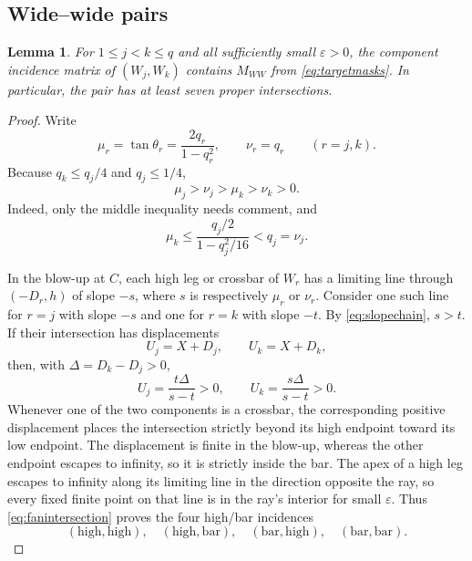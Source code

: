 \documentclass[11pt]{amsart}
\newtheorem{lemma}[lemma]{Lemma}
\theoremstyle{definition}
\newcommand{\eps}{\varepsilon}
\begin{document}
\subsection{Wide--wide pairs}

\begin{lemma}\label{lem:WW}
For $1\le j<k\le q$ and all sufficiently small $\eps>0$, the component
incidence matrix of $(W_j,W_k)$ contains $M_{WW}$ from
\eqref{eq:targetmasks}.  In particular, the pair has at least seven proper
intersections.
\end{lemma}

\begin{proof}
Write
\[
 \mu_r=\tan\theta_r=\frac{2q_r}{1-q_r^2},
 \qquad \nu_r=q_r
 \qquad(r=j,k).
\]
Because $q_k\le q_j/4$ and $q_j\le1/4$,
\begin{equation}\label{eq:slopechain}
 \mu_j>\nu_j>\mu_k>\nu_k>0.
\end{equation}
Indeed, only the middle inequality needs comment, and
\[
 \mu_k\le\frac{q_j/2}{1-q_j^2/16}<q_j=\nu_j.
\]

In the blow-up at $C$, each high leg or crossbar of $W_r$ has a limiting
line through $(-D_r,h)$ of slope $-s$, where $s$ is respectively $\mu_r$ or
$\nu_r$.  Consider one such line for $r=j$ with slope $-s$ and one for
$r=k$ with slope $-t$.  By \eqref{eq:slopechain}, $s>t$.  If their
intersection has displacements
\[
 U_j=X+D_j,
 \qquad U_k=X+D_k,
\]
then, with $\Delta=D_k-D_j>0$,
\begin{equation}\label{eq:fanintersection}
 U_j=\frac{t\Delta}{s-t}>0,
 \qquad
 U_k=\frac{s\Delta}{s-t}>0.
\end{equation}
Whenever one of the two components is a crossbar, the corresponding
positive displacement places the intersection strictly beyond its high
endpoint toward its low endpoint.  The displacement is finite in the
blow-up, whereas the other endpoint escapes to infinity, so it is strictly
inside the bar.  The apex of a high leg escapes to infinity along its limiting line in
the direction opposite the ray, so every fixed finite point on that line is
in the ray's interior for small $\eps$.  Thus
\eqref{eq:fanintersection} proves the four high/bar incidences
\[
 (\text{high},\text{high}),\quad
 (\text{high},\text{bar}),\quad
 (\text{bar},\text{high}),\quad
 (\text{bar},\text{bar}).
\]


\end{proof}
\end{document}
